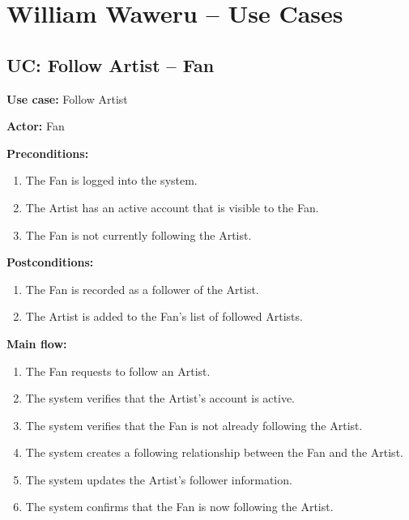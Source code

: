 \documentclass[11pt]{report}
\begin{document}
\section{William Waweru -- Use Cases}

\subsection{UC: Follow Artist -- Fan}

{\bfseries Use case:} Follow Artist

{\bfseries Actor:} Fan

{\bfseries Preconditions:}
\begin{enumerate}
    \item The Fan is logged into the system.
    \item The Artist has an active account that is visible to the Fan.
    \item The Fan is not currently following the Artist.
\end{enumerate}

{\bfseries Postconditions:}
\begin{enumerate}
    \item The Fan is recorded as a follower of the Artist.
    \item The Artist is added to the Fan's list of followed Artists.
\end{enumerate}

{\bfseries Main flow:}
\begin{enumerate}
    \item The Fan requests to follow an Artist.
    \item The system verifies that the Artist's account is active.
    \item The system verifies that the Fan is not already following the Artist.
    \item The system creates a following relationship between the Fan and the Artist.
    \item The system updates the Artist's follower information.
    \item The system confirms that the Fan is now following the Artist.
\end{enumerate}
\end{document}
